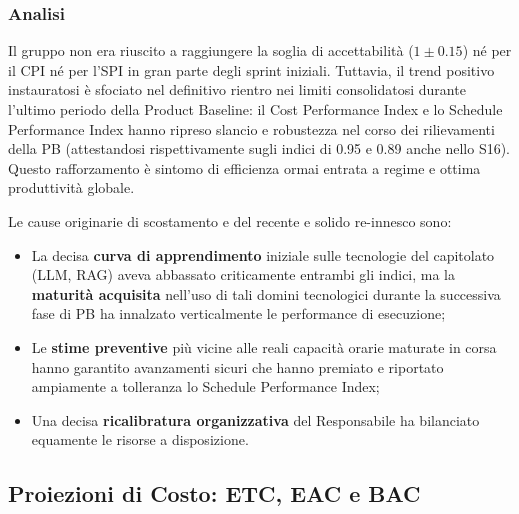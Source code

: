 \documentclass[a4paper,11pt,oneside]{scrartcl}
\begin{document}
\subsubsection*{Analisi}

Il gruppo non era riuscito a raggiungere la soglia di accettabilità ($1 \pm 0.15$) né per il CPI né per l'SPI in gran parte degli sprint iniziali. Tuttavia, il trend positivo instauratosi è sfociato nel definitivo rientro nei limiti consolidatosi durante l'ultimo periodo della Product Baseline: il Cost Performance Index e lo Schedule Performance Index hanno ripreso slancio e robustezza nel corso dei rilievamenti della PB (attestandosi rispettivamente sugli indici di 0.95 e 0.89 anche nello S16). Questo rafforzamento è sintomo di efficienza ormai entrata a regime e ottima produttività globale.

Le cause originarie di scostamento e del recente e solido re-innesco sono:
\begin{itemize}
    \item La decisa \textbf{curva di apprendimento} iniziale sulle tecnologie del capitolato (LLM{\scriptsize{}}, RAG{\scriptsize{}}) aveva abbassato criticamente entrambi gli indici, ma la \textbf{maturità acquisita} nell'uso di tali domini tecnologici durante la successiva fase di PB ha innalzato verticalmente le performance di esecuzione;
    \item Le \textbf{stime preventive} più vicine alle reali capacità orarie maturate in corsa hanno garantito avanzamenti sicuri che hanno premiato e riportato ampiamente a tolleranza lo Schedule Performance Index;
    \item Una decisa \textbf{ricalibratura organizzativa} del Responsabile ha bilanciato equamente le risorse a disposizione.
\end{itemize}

\subsection{Proiezioni di Costo: ETC, EAC e BAC}
\end{document}
